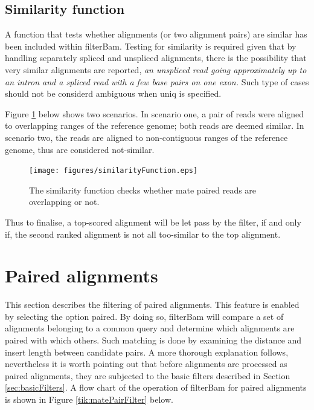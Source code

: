 \documentclass[11pt]{article}
\newcommand{\option}[1]{{\fontfamily{phv}\selectfont#1}}
\begin{document}
{\subsection{Similarity function}
A function that tests whether alignments (or two alignment pairs) are similar has been included within 
filterBam. Testing for similarity is required given that by handling separately spliced and unspliced 
alignments, there is the possibility that very similar alignments are reported, \emph{an unspliced read going approximately up to an intron and a spliced read with a few base pairs on one exon.} Such type of cases 
should not be considerd ambiguous when \option{uniq} is specified. 
  
Figure \ref{fig:similarityFunction} below shows two scenarios. In scenario one, a pair of reads were aligned 
to overlapping ranges of the reference genome; both reads are deemed similar. In scenario two, the reads 
are aligned to non-contiguous ranges of the reference genome, thus are considered not-similar.

\begin{figure}
  \begin{center}
    \texttt{[image: figures/similarityFunction.eps]}
  \end{center}
\caption{The similarity function checks whether mate paired reads are overlapping or not.}
\label{fig:similarityFunction}
\end{figure}
 
Thus to finalise, a top-scored alignment will be let pass by the filter, if and only if, the second ranked 
alignment is not all too-similar to the top alignment.

\section{Paired alignments} \label{sec:pairedAls}

This section describes the filtering of paired alignments. This feature is enabled by selecting the option  
\option{paired}. By doing so, filterBam will compare a set of alignments belonging to a common query and 
determine which alignments are paired with which others. Such matching is done by examining the distance and 
insert length between candidate pairs. A more thorough explanation follows, nevertheless it is worth 
pointing out that before alignments are processed as paired alignments, they are subjected to the basic 
filters described in Section \ref{sec:basicFilters}. A flow chart of the operation of filterBam for paired 
alignments is shown in Figure \ref{tik:matePairFilter} below.


}
\end{document}
